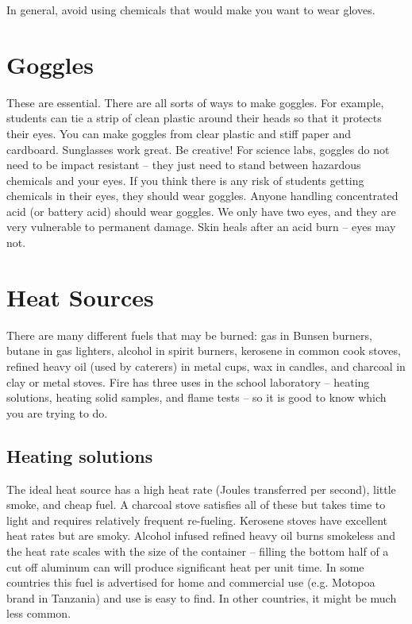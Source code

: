 In general, 
avoid using chemicals that would make you want to wear gloves.

\section{Goggles}
\label{sec:goggles}
These are essential. 
There are all sorts of ways to make goggles. 
For example, 
students can tie a strip of clean plastic around their heads 
so that it protects their eyes. 
You can make goggles from clear plastic and stiff paper and cardboard. 
Sunglasses work great. 
Be creative! For science labs, 
goggles do not need to be impact resistant -- 
they just need to stand between hazardous chemicals and your eyes. 
If you think there is any risk of students getting chemicals in their eyes, 
they should wear goggles. 
Anyone handling concentrated acid (or battery acid) should wear goggles. 
We only have two eyes, 
and they are very vulnerable to permanent damage. 
Skin heals after an acid burn -- eyes may not.

\section{Heat Sources}
\label{sec:heatsources}
There are many different fuels that may be burned: gas in Bunsen burners, 
butane in gas lighters, 
alcohol in spirit burners, 
kerosene in common cook stoves, 
refined heavy oil (used by caterers) in metal cups, 
wax in candles, 
and charcoal in clay or metal stoves. 
Fire has three uses in the school laboratory -- heating solutions, 
heating solid samples, 
and flame tests -- so it is good to know which you are trying to do.

\subsection{Heating solutions}
The ideal heat source has a high heat rate (Joules transferred per second), 
little smoke, 
and cheap fuel. 
A charcoal stove satisfies all of these 
but takes time to light and requires relatively frequent re-fueling. 
Kerosene stoves have excellent heat rates but are smoky. 
Alcohol infused refined heavy oil burns smokeless 
and the heat rate scales with the size of the container -- 
filling the bottom half of a cut off aluminum can 
will produce significant heat per unit time. 
In some countries this fuel is advertised for home and commercial use (e.g. 
Motopoa brand in Tanzania) and use is easy to find. 
In other countries, 
it might be much less common.


